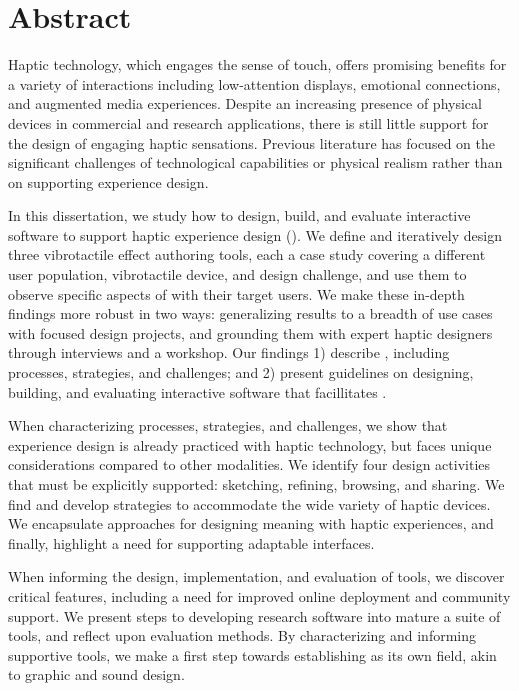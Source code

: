 
\chapter{Abstract}

Haptic technology, which engages the sense of touch, offers promising benefits for a variety of interactions including low-attention displays, emotional connections, and augmented media experiences.
Despite %
an increasing presence of physical devices in commercial and research applications, there is still little support for the design of engaging haptic sensations.
Previous literature has focused on the significant challenges of technological capabilities or physical realism rather than on supporting experience design. %

In this dissertation, we study how to design, build, and evaluate interactive software to support haptic experience design (\haxd).
We define \haxd and iteratively design three vibrotactile effect authoring tools, each a case study covering a different user population, vibrotactile device, and design challenge, and use them to observe specific aspects of \haxd with their target users.
We make these in-depth findings more robust in two ways: generalizing results to a breadth of use cases with focused design projects, and grounding them with expert haptic designers through interviews and a workshop.
Our findings 1) describe \haxd, including processes, strategies, and challenges; and 2) present guidelines on designing, building, and evaluating interactive software that facillitates \haxd.

When characterizing \haxd processes, strategies, and challenges, 
we show that experience design is already practiced with haptic technology, but faces unique considerations compared to other modalities. 
We identify four design activities that must be explicitly supported: sketching, refining, browsing, and sharing.
We find and develop strategies to accommodate the wide variety of haptic devices.
We encapsulate approaches for designing meaning with haptic experiences, and finally, highlight a need for supporting adaptable interfaces.

When informing the design, implementation, and evaluation of \haxd tools,
we discover critical features, including a need for improved online deployment and community support.
We present steps to developing research software into mature a \haxd suite of tools, and reflect upon evaluation methods.
%
By characterizing \haxd and informing supportive tools, we make a first step towards establishing \haxd as its own field, akin to graphic and sound design.

